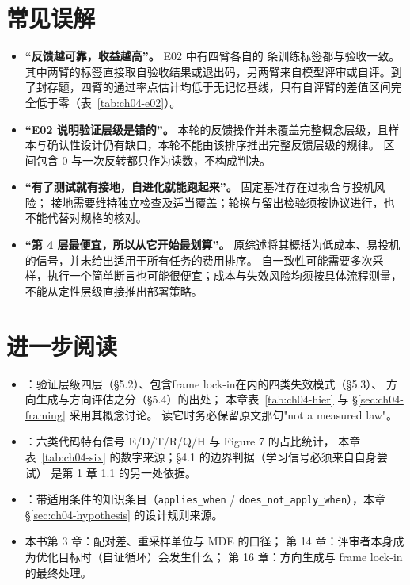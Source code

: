 \section*{常见误解}
\begin{itemize}
\sloppy
  \item \textbf{“反馈越可靠，收益越高”。}
        E02 中有四臂各自的  条训练标签都与验收一致。其中两臂的标签直接取自验收结果或退出码，另两臂来自模型评审或自评。到了封存题，四臂的通过率点估计均低于无记忆基线，只有自评臂的差值区间完全低于零（表~\ref{tab:ch04-e02}）。
  \item \textbf{“E02 说明验证层级是错的”。}
        本轮的反馈操作并未覆盖完整概念层级，且样本与确认性设计仍有缺口，本轮不能由该排序推出完整反馈层级的规律。
        区间包含 0 与一次反转都只作为读数，不构成判决。
  \item \textbf{“有了测试就有接地，自进化就能跑起来”。}
        固定基准存在过拟合与投机风险\cite{rsi-survey-2607}；
        接地需要维持独立检查及适当覆盖；轮换与留出检验须按协议进行，也不能代替对规格的核对。
  \item \textbf{“第 4 层最便宜，所以从它开始最划算”。}
        原综述将其概括为低成本、易投机的信号\cite{rsi-survey-2607}，并未给出适用于所有任务的费用排序。
        自一致性可能需要多次采样，执行一个简单断言也可能很便宜；成本与失效风险均须按具体流程测量，不能从定性层级直接推出部署策略。
\end{itemize}

\section*{进一步阅读}
\begin{itemize}
\sloppy
  \item \cite{rsi-survey-2607}：验证层级四层（\S 5.2）、包含frame lock-in在内的四类失效模式（\S 5.3）、
        方向生成与方向评估之分（\S 5.4）的出处；
        本章表~\ref{tab:ch04-hier} 与 \S\ref{sec:ch04-framing} 采用其概念讨论。
        读它时务必保留原文那句"not a measured law"。
  \item \cite{coding-survey-2608}：六类代码特有信号 E/D/T/R/Q/H 与 Figure 7 的占比统计，
        本章表~\ref{tab:ch04-six} 的数字来源；\S 4.1 的边界判据（学习信号必须来自自身尝试）
        是第 1 章 1.1 的另一处依据。
  \item \cite{ksi-2607}：带适用条件的知识条目（\texttt{applies\_when} /
        \texttt{does\_not\_apply\_when}），本章 \S\ref{sec:ch04-hypothesis} 的设计规则来源。
  \item 本书第 3 章：配对差、重采样单位与 MDE 的口径；
        第 14 章：评审者本身成为优化目标时（自证循环）会发生什么；
        第 16 章：方向生成与 frame lock-in 的最终处理。
\end{itemize}
